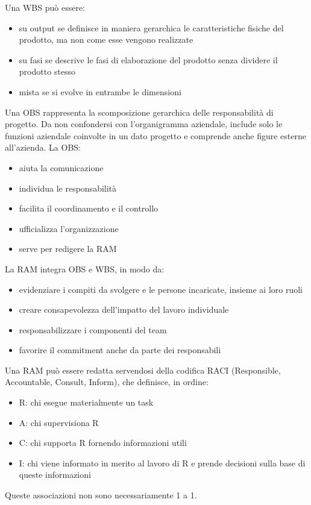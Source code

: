 \documentclass[answers, a4paper, 11pt]{exam}
\begin{document}
\begin{questions}
\begin{parts}
\begin{solution}
Una WBS può essere:
\begin{itemize}
    \item su output se definisce in maniera gerarchica le caratteristiche fisiche del prodotto, ma non come esse vengono realizzate
    \item su fasi se descrive le fasi di elaborazione del prodotto senza dividere il prodotto stesso
    \item mista se si evolve in entrambe le dimensioni
\end{itemize}

Una OBS rappresenta la scomposizione gerarchica delle responsabilità di progetto.
Da non confondersi con l'organigramma aziendale, include solo le funzioni aziendale coinvolte in un dato progetto e comprende anche figure esterne all'azienda.
La OBS:
\begin{itemize}
    \item aiuta la comunicazione
    \item individua le responsabilità
    \item facilita il coordinamento e il controllo
    \item ufficializza l'organizzazione
    \item serve per redigere la RAM
\end{itemize}


La RAM integra OBS e WBS, in modo da:
\begin{itemize}
    \item evidenziare i compiti da svolgere e le persone incaricate, insieme ai loro ruoli
    \item creare consapevolezza dell'impatto del lavoro individuale
    \item responsabilizzare i componenti del team
    \item favorire il commitment anche da parte dei responsabili
\end{itemize}
Una RAM può essere redatta servendosi della codifica RACI (Responsible, Accountable, Consult, Inform), che definisce, in ordine:
\begin{itemize}
    \item R: chi esegue materialmente un task
    \item A: chi supervisiona R
    \item C: chi supporta R fornendo informazioni utili
    \item I: chi viene informato in merito al lavoro di R e prende decisioni sulla base di queste informazioni
\end{itemize}

Queste associazioni non sono necessariamente 1 a 1.

\end{solution}
\end{parts}
\end{questions}
\end{document}
